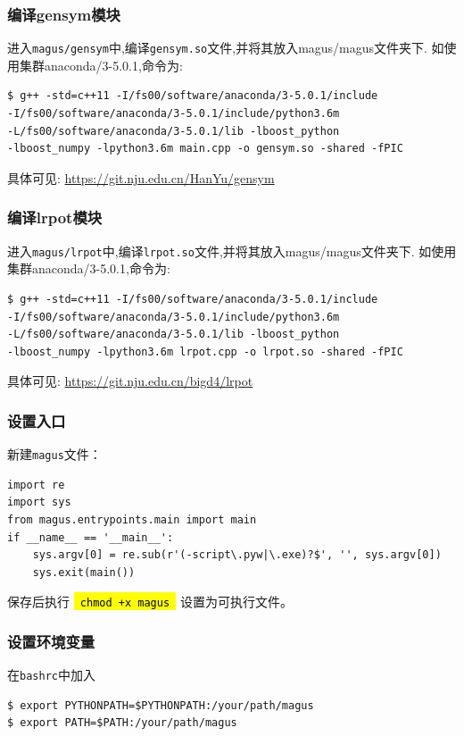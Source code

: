 \documentclass[12pt]{article}
\newcommand{\code}[1]{
  \begingroup
  \sethlcolor{Seashell}
  {\hl{\texttt{~#1~}}}
  \endgroup
}
\newcommand{\file}[1]{\texttt{#1}}
\begin{document}
\subsubsection{编译gensym模块}
进入\file{magus/gensym}中,编译\file{gensym.so}文件,并将其放入magus/magus文件夹下.
如使用集群anaconda/3-5.0.1,命令为:
\begin{tcolorbox}
    \begin{verbatim}
$ g++ -std=c++11 -I/fs00/software/anaconda/3-5.0.1/include 
-I/fs00/software/anaconda/3-5.0.1/include/python3.6m 
-L/fs00/software/anaconda/3-5.0.1/lib -lboost_python 
-lboost_numpy -lpython3.6m main.cpp -o gensym.so -shared -fPIC
    \end{verbatim}
\end{tcolorbox}
具体可见:
\textcolor{blue}{\url{https://git.nju.edu.cn/HanYu/gensym}}
\subsubsection{编译lrpot模块}
进入\file{magus/lrpot}中,编译\file{lrpot.so}文件,并将其放入magus/magus文件夹下.
如使用集群anaconda/3-5.0.1,命令为:
\begin{tcolorbox}
    \begin{verbatim}
$ g++ -std=c++11 -I/fs00/software/anaconda/3-5.0.1/include 
-I/fs00/software/anaconda/3-5.0.1/include/python3.6m 
-L/fs00/software/anaconda/3-5.0.1/lib -lboost_python 
-lboost_numpy -lpython3.6m lrpot.cpp -o lrpot.so -shared -fPIC
\end{verbatim}
\end{tcolorbox}
具体可见:
\textcolor{blue}{\url{https://git.nju.edu.cn/bigd4/lrpot}}
\subsubsection{设置入口}
新建\file{magus}文件：
\begin{tcolorbox}
    \begin{verbatim}
import re
import sys
from magus.entrypoints.main import main
if __name__ == '__main__':
    sys.argv[0] = re.sub(r'(-script\.pyw|\.exe)?$', '', sys.argv[0])
    sys.exit(main())
    \end{verbatim}
\end{tcolorbox}
保存后执行\code{chmod +x magus}设置为可执行文件。
\subsubsection{设置环境变量}
在\file{bashrc}中加入
\begin{tcolorbox}
    \begin{verbatim}
$ export PYTHONPATH=$PYTHONPATH:/your/path/magus
$ export PATH=$PATH:/your/path/magus
    \end{verbatim}
\end{tcolorbox}
\end{document}
